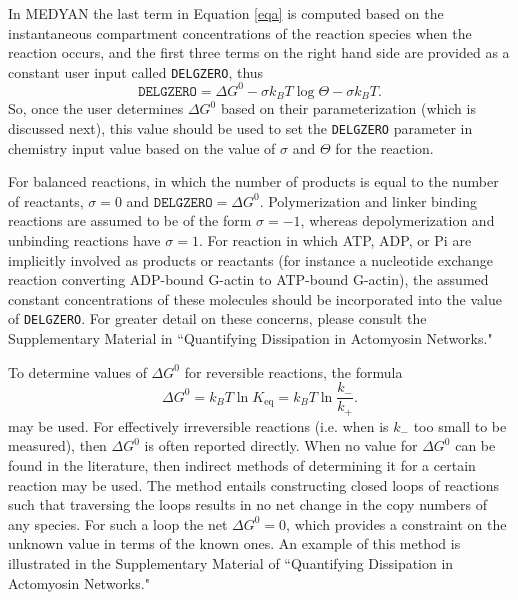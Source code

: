 \documentclass[11pt, oneside]{article}   	%
\begin{document}
In MEDYAN the last term in Equation \ref{eqa} is computed based on the instantaneous compartment concentrations of the reaction species when the reaction occurs, and the first three terms on the right hand side are provided as a constant user input called \texttt{DELGZERO}, thus
\begin{equation}
\label{eqc}
\texttt{DELGZERO} = \Delta G^0 - \sigma k_B T  \log{\Theta} - \sigma k_B T.
\end{equation}
So, once the user determines $\Delta G^0$ based on their parameterization (which is discussed next), this value should be used to set the \texttt{DELGZERO} parameter in chemistry input value based on the value of $\sigma$ and $\Theta$ for the reaction.  

For balanced reactions, in which the number of products is equal to the number of reactants, $\sigma = 0$ and $\texttt{DELGZERO} = \Delta G^0$.  Polymerization and linker binding reactions are assumed to be of the form $\sigma = -1$, whereas depolymerization and unbinding reactions have $\sigma = 1$.  For reaction in which ATP, ADP, or Pi are implicitly involved as products or reactants (for instance a nucleotide exchange reaction converting ADP-bound G-actin to ATP-bound G-actin), the assumed constant concentrations of these molecules should be incorporated into the value of \texttt{DELGZERO}.  For greater detail on these concerns, please consult the Supplementary Material in ``Quantifying Dissipation in Actomyosin Networks."  

To determine values of $\Delta G^0$ for reversible reactions, the formula
\begin{equation}
\Delta G^0 = k_B T \ln K_\text{eq} = k_B T \ln \frac{k_-}{k_+}.
\label{eqd}
\end{equation} 
may be used.  For effectively irreversible reactions (i.e. when is $k_-$ too small to be measured), then $\Delta G^0$ is often reported directly.  When no value for $\Delta G^0$ can be found in the literature, then indirect methods of determining it for a certain reaction may be used.  The method entails constructing closed loops of reactions such that traversing the loops results in no net change in the copy numbers of any species.  For such a loop the net $\Delta G^0 = 0$, which provides a constraint on the unknown value in terms of the known ones.  An example of this method is illustrated in the Supplementary Material of ``Quantifying Dissipation in Actomyosin Networks."  
\end{document}
